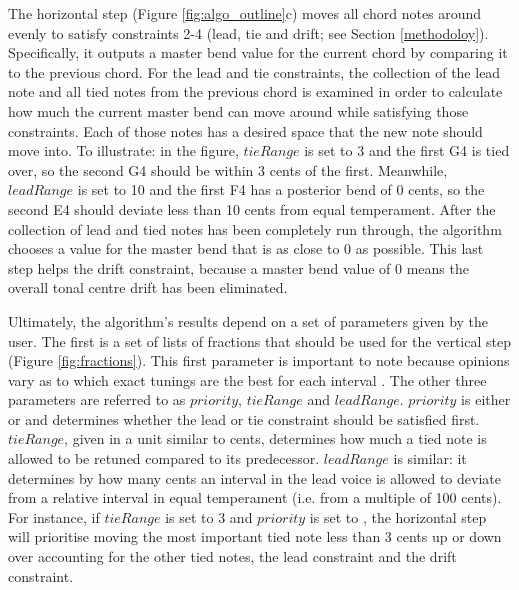 \documentclass[a4paper]{article}
\begin{document}
The horizontal step (Figure \ref{fig:algo_outline}c) moves all chord notes around evenly to satisfy constraints 2-4 (lead, tie and drift; see Section \ref{methodoloy}). Specifically, it outputs a master bend value for the current chord by comparing it to the previous chord. For the lead and tie constraints, the collection of the lead note and all tied notes from the previous chord is examined in order to calculate how much the current master bend can move around while satisfying those constraints. Each of those notes has a desired space that the new note should move into. To illustrate: in the figure, $\mathit{tieRange}$ is set to 3 and the first G4 is tied over, so the second G4 should be within 3 cents of the first. Meanwhile, $\mathit{leadRange}$ is set to 10 and the first F4 has a posterior bend of 0 cents, so the second E4 should deviate less than 10 cents from equal temperament. After the collection of lead and tied notes has been completely run through, the algorithm chooses a value for the master bend that is as close to 0 as possible. This last step helps the drift constraint, because a master bend value of 0 means the overall tonal centre drift has been eliminated.

Ultimately, the algorithm's results depend on a set of parameters given by the user. The first is a set of lists of fractions that should be used for the vertical step (Figure \ref{fig:fractions}). This first parameter is important to note because opinions vary as to which exact tunings are the best for each interval \cite{nordmark_intonation_1996}. The other three parameters are referred to as $\mathit{priority}$, $\mathit{tieRange}$ and $\mathit{leadRange}$. $\mathit{priority}$ is either  or  and determines whether the lead or tie constraint should be satisfied first. $\mathit{tieRange}$, given in a unit similar to cents, determines how much a tied note is allowed to be retuned compared to its predecessor. $\mathit{leadRange}$ is similar: it determines by how many cents an interval in the lead voice is allowed to deviate from a relative interval in equal temperament (i.e. from a multiple of 100 cents). For instance, if $\mathit{tieRange}$ is set to 3 and $\mathit{priority}$ is set to , the horizontal step will prioritise moving the most important tied note less than 3 cents up or down over accounting for the other tied notes, the lead constraint and the drift constraint.
\end{document}
